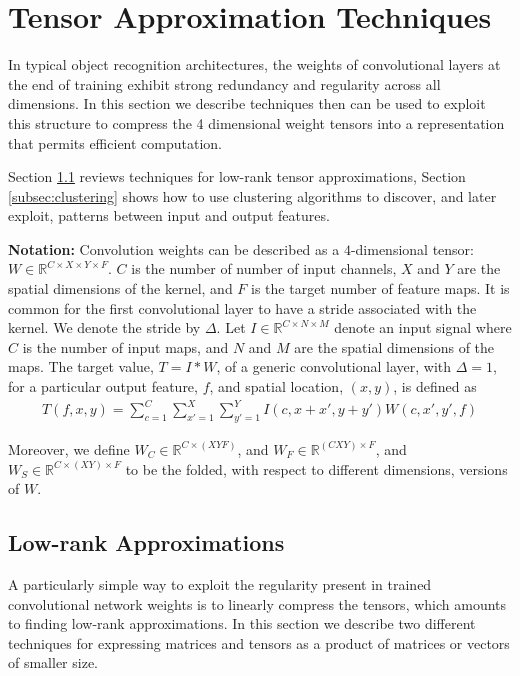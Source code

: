 \section{Tensor Approximation Techniques}\label{sec:approx_tech}
In typical object recognition architectures, the weights of
convolutional layers at the end of training exhibit strong redundancy
and regularity across all dimensions. In this section we describe
techniques then can be used to exploit this structure to compress the
4 dimensional weight tensors into a representation that permits
efficient computation. 

Section \ref{subsec:low_rank} reviews techniques for low-rank tensor
approximations,
Section \ref{subsec:clustering} shows how to use clustering algorithms to
discover, and later exploit, patterns between input and output
features.

 \vspace{2mm}

 \noindent \textbf{Notation:} Convolution weights can be described as
 a $4$-dimensional tensor: $W \in \mathbb{R}^{C \times X \times Y
   \times F}$. $C$ is the number of number of input channels, $X$ and
 $Y$ are the spatial dimensions of the kernel, and $F$ is the target
 number of feature maps. It is common for the first convolutional layer to have a stride associated with the kernel. We denote the stride by $\Delta$.  Let $I \in \mathbb{R}^{C \times N \times M}$
 denote an input signal where $C$ is the number of input maps, and $N$
 and $M$ are the spatial dimensions of the maps.  The target value, $T
 = I \ast W$, of a generic convolutional layer, with $\Delta = 1$, for a particular output
 feature, $f$, and spatial location, $(x, y)$, is defined as
\begin{align*}
\label{convlayereq}
T(f,x,y) = \sum_{c=1}^C \sum_{x'=1}^{X} \sum_{y'=1}^{Y} I(c,x+x',y+y') W(c,x',y',f)
\end{align*}

Moreover, we define $W_C \in \mathbb{R}^{C \times (XYF)}$, and $W_F \in \mathbb{R}^{(CXY) \times F}$, 
and $W_S \in \mathbb{R}^{C \times (XY) \times F}$ to be the folded, with respect to different dimensions, versions of $W$.

\vspace{-0.3cm}
\subsection{Low-rank Approximations}\label{subsec:low_rank}
A particularly simple way to exploit the regularity present in trained convolutional network weights is to linearly compress the tensors, which amounts to finding low-rank approximations. In this section we describe two different techniques for expressing matrices and tensors as a product of matrices or vectors of smaller size. 

